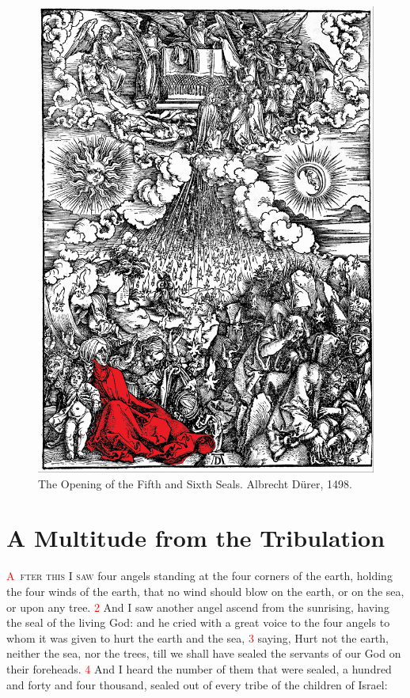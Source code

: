 \documentclass[12pt,twoside]{memoir}
\newcommand{\vnum}[1]{\textcolor{red}{\normalsize{#1}}}
\begin{document}
  \begin{figure}[p]
  	\centering
  	\includegraphics[scale=0.3]{Durer/Durer_Sixth_Seal.jpg}
  	\caption{The Opening of the Fifth and Sixth Seals. Albrecht Dürer, 1498.}
  \end{figure}


\chapter{A Multitude from the Tribulation}
\lettrine[lines=3]{\textcolor{red}{A}}{\ fter this I saw} four angels standing at the four corners of the earth, holding the four winds of the earth, that no wind should blow on the earth, or on the sea, or upon any tree. %
\vnum{2} And I saw another angel ascend from the sunrising, having the seal of the living God: and he cried with a great voice to the four angels to whom it was given to hurt the earth and the sea, %
\vnum{3} saying, Hurt not the earth, neither the sea, nor the trees, till we shall have sealed the servants of our God on their foreheads. %
\vnum{4} And I heard the number of them that were sealed, a hundred and forty and four thousand, sealed out of every tribe of the children of Israel:
\end{document}
